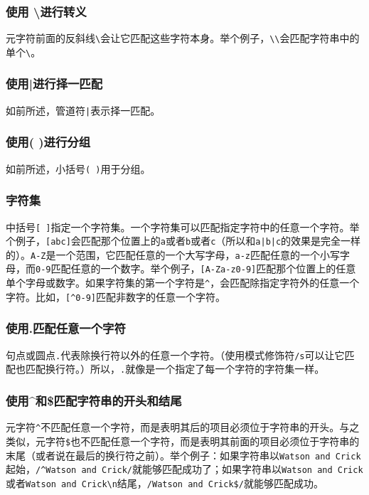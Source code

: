 \subsubsection{使用 \textbackslash 进行转义}
元字符前面的反斜线\verb|\|会让它匹配这些字符本身。举个例子，\verb|\\|会匹配字符串中的单个\verb|\|。

\subsubsection{使用|进行择一匹配}
如前所述，管道符\verb=|=表示择一匹配。

\subsubsection{使用( )进行分组}
如前所述，小括号\verb|( )|用于分组。

\subsubsection{字符集}
中括号\verb|[ ]|指定一个字符集。一个字符集可以匹配指定字符中的任意一个字符。举个例子，\verb|[abc]|会匹配那个位置上的\verb|a|或者\verb|b|或者\verb|c|（所以和\verb=a|b|c=的效果是完全一样的）。\verb|A-Z|是一个范围，它匹配任意的一个大写字母，\verb|a-z|匹配任意的一个小写字母，而\verb|0-9|匹配任意的一个数字。举个例子，\verb|[A-Za-z0-9]|匹配那个位置上的任意单个字母或数字。如果字符集的第一个字符是\verb|^|，会匹配除指定字符外的任意一个字符。比如，\verb|[^0-9]|匹配非数字的任意一个字符。

\subsubsection{使用.匹配任意一个字符}
句点或圆点\verb|.|代表除换行符以外的任意一个字符。（使用模式修饰符\verb|/s|可以让它匹配也匹配换行符。）所以，\verb|.|就像是一个指定了每一个字符的字符集一样。

\subsubsection{使用\^{}和\$匹配字符串的开头和结尾}
元字符\verb|^|不匹配任意一个字符，而是表明其后的项目必须位于字符串的开头。与之类似，元字符\verb|$|也不匹配任意一个字符，而是表明其前面的项目必须位于字符串的末尾（或者说在最后的换行符之前）。举个例子：如果字符串以\verb|Watson and Crick|起始，\verb|/^Watson and Crick/|就能够匹配成功了；如果字符串以\verb|Watson and Crick|或者\verb|Watson and Crick\n|结尾，\verb|/Watson and Crick$/|就能够匹配成功。

